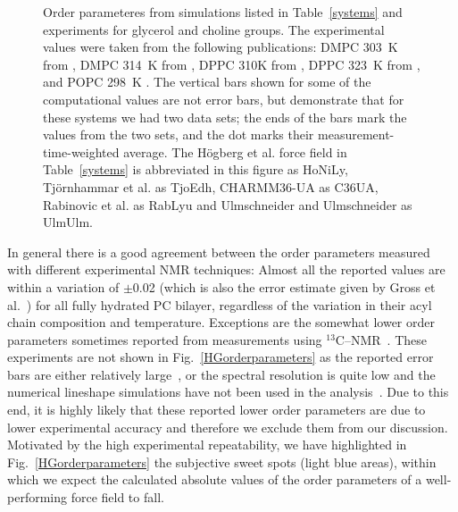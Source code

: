 \documentclass[pre,aps,floatfix,authordate1-4,twocolumn]{revtex4-1}
\begin{document}
\begin{figure}[]
{  Order parameteres from simulations listed in Table~\ref{systems} and experiments for glycerol and choline groups.
  The experimental values were taken from the following publications: DMPC 303~K from \cite{gross97}, DMPC 314~K from \cite{dvinskikh05a}, DPPC 310K from \cite{gally75}, 
  DPPC 323~K from \cite{akutsu81}, and POPC 298~K \cite{ferreira13}.
  The vertical bars shown for some of the computational values are not error bars, but demonstrate that for 
  these systems we had two data sets; the ends of the bars mark the values from the two sets, and the dot marks their measurement-time-weighted average. 
  The H{\"o}gberg et al. force field in Table~\ref{systems} is abbreviated in this figure as HoNiLy, Tj{\"o}rnhammar et al. as TjoEdh, CHARMM36-UA as C36UA,
  Rabinovic et al. as RabLyu and Ulmschneider and Ulmschneider as UlmUlm.
} 
\end{figure}

In general there is a good agreement between the order parameters measured with different experimental NMR techniques: Almost all the 
reported values are within a variation of $\pm$0.02 (which is also the error estimate given by Gross et al.~\cite{gross97}) 
for all fully hydrated PC bilayer, regardless of the variation in their acyl chain composition and temperature.
Exceptions are the somewhat lower order parameters sometimes reported from measurements using $^{13}$C--NMR~\cite{hong95a,hong95b,warschawski05}.
These experiments are not shown in Fig.~\ref{HGorderparameters} as the reported error bars are either relatively large~\cite{hong95a,hong95b}, 
or the spectral resolution is quite low and the numerical lineshape simulations have not been used in the analysis~\cite{warschawski05}.
Due to this end, it is highly likely that these reported lower order parameters are due to lower experimental 
accuracy and therefore we exclude them from our discussion. 
Motivated by the high experimental repeatability, we have highlighted in 
Fig.~\ref{HGorderparameters} the subjective sweet spots (light blue areas), within which we expect the calculated absolute 
values of the order parameters of a well-performing force field to fall.

\end{document}

